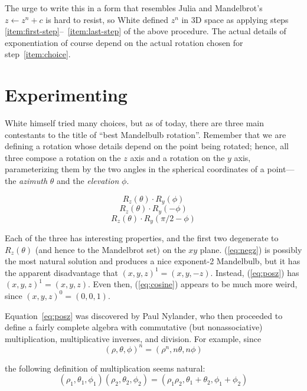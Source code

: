 \documentclass{article}
\begin{document}
The urge to write this in a form that resembles Julia and Mandelbrot's
$z\leftarrow z^n+c$ is hard to resist, so White defined $z^n$ in 3D space as
applying steps \ref{item:first-step}--~\ref{item:last-step} of the
above procedure.  The actual details of exponentiation of course
depend on the actual rotation chosen for step~\ref{item:choice}.

\section{Experimenting}

White himself tried many choices, but as of today, there are three
main contestants to the title of ``best Mandelbulb rotation''.
Remember that we are defining a rotation whose details depend on the
point being rotated; hence, all three compose a rotation on the $z$ axis
and a rotation on the $y$ axis, parameterizing them by the two angles in
the spherical coordinates of a point---the \emph{azimuth} $\theta$ and
the \emph{elevation} $\phi$.

\begin{equation}
\label{eq:negz}
  R_z(\theta) \cdot R_y(\phi)
\end{equation}
\begin{equation}
\label{eq:posz}
  R_z(\theta) \cdot R_y(-\phi)
\end{equation}
\begin{equation}
\label{eq:cosine}
  R_z(\theta) \cdot R_y(\pi/2-\phi)
\end{equation}

Each of the three has interesting properties, and the first two
degenerate to $R_z(\theta)$ (and hence to the Mandelbrot set) on the
$xy$ plane.  (\ref{eq:negz}) is possibly the most natural solution and
produces a nice exponent-2 Mandelbulb, but it has the apparent
disadvantage that $(x,y,z)^1=(x,y,-z)$.  Instead, (\ref{eq:posz}) has
$(x,y,z)^1=(x,y,z)$.  Even then, (\ref{eq:cosine}) appears to be
much more weird, since $(x,y,z)^0=(0,0,1)$.

Equation~\ref{eq:posz} was discovered by Paul Nylander, who then proceeded to
define a fairly complete algebra with commutative (but nonassociative)
multiplication, multiplicative inverses, and division.  For example,
since
\begin{equation}
  \label{eq:posz-exp}
  (\rho,\theta,\phi)^n=(\rho^n, n\theta, n\phi)
\end{equation}

\noindent
the following definition of multiplication seems natural:
\begin{equation*}
  (\rho_1,\theta_1,\phi_1) (\rho_2,\theta_2,\phi_2)=
  (\rho_1 \rho_2,\theta_1+\theta_2,\phi_1+\phi_2)
\end{equation*}
\end{document}
